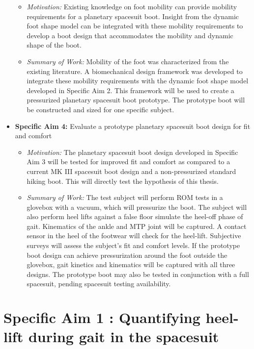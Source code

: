\documentclass[defaultstyle,11pt]{comps}
\providecommand{\tightlist}{%
  \setlength{\itemsep}{0pt}\setlength{\parskip}{0pt}}
\begin{document}
\begin{itemize}
  \begin{itemize}
  \tightlist
  \item
    \emph{Motivation:} Existing knowledge on foot mobility can provide mobility requirements for a planetary spacesuit boot. Insight from the dynamic foot shape model can be integrated with these mobility requirements to develop a boot design that accommodates the mobility and dynamic shape of the boot.
  \item
    \emph{Summary of Work:} Mobility of the foot was characterized from the existing literature. A biomechanical design framework was developed to integrate these mobility requirements with the dynamic foot shape model developed in Specific Aim 2. This framework will be used to create a pressurized planetary spacesuit boot prototype. The prototype boot will be constructed and sized for one specific subject.
  \end{itemize}
\item
  \textbf{Specific Aim 4: } Evaluate a prototype planetary spacesuit boot design for fit and comfort

  \begin{itemize}
  \tightlist
  \item
    \emph{Motivation:} The planetary spacesuit boot design developed in Specific Aim 3 will be tested for improved fit and comfort as compared to a current MK III spacesuit boot design and a non-pressurized standard hiking boot. This will directly test the hypothesis of this thesis.
  \item
    \emph{Summary of Work:} The test subject will perform ROM tests in a glovebox with a vacuum, which will pressurize the boot. The subject will also perform heel lifts against a false floor simulate the heel-off phase of gait. Kinematics of the ankle and MTP joint will be captured. A contact sensor in the heel of the footwear will check for the heel-lift. Subjective surveys will assess the subject's fit and comfort levels. If the prototype boot design can achieve pressurization around the foot outside the glovebox, gait kinetics and kinematics will be captured with all three designs. The prototype boot may also be tested in conjunction with a full spacesuit, pending spacesuit testing availability.
  \end{itemize}
\end{itemize}

\hypertarget{specific-aim-1-quantifying-heel-lift-during-gait-in-the-spacesuit}{%
\chapter{Specific Aim 1 : Quantifying heel-lift during gait in the spacesuit}\label{specific-aim-1-quantifying-heel-lift-during-gait-in-the-spacesuit}}
\end{document}
